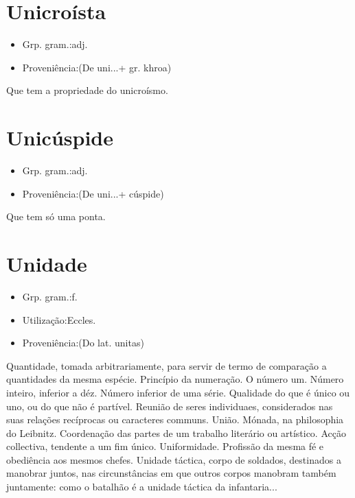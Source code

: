 \documentclass{article}
\begin{document}
\section{Unicroísta}
\begin{itemize}
\item {Grp. gram.:adj.}
\end{itemize}
\begin{itemize}
\item {Proveniência:(De \textunderscore uni...\textunderscore  + gr. \textunderscore khroa\textunderscore )}
\end{itemize}
Que tem a propriedade do unicroísmo.
\section{Unicúspide}
\begin{itemize}
\item {Grp. gram.:adj.}
\end{itemize}
\begin{itemize}
\item {Proveniência:(De \textunderscore uni...\textunderscore  + \textunderscore cúspide\textunderscore )}
\end{itemize}
Que tem só uma ponta.
\section{Unidade}
\begin{itemize}
\item {Grp. gram.:f.}
\end{itemize}
\begin{itemize}
\item {Utilização:Eccles.}
\end{itemize}
\begin{itemize}
\item {Proveniência:(Do lat. \textunderscore unitas\textunderscore )}
\end{itemize}
Quantidade, tomada arbitrariamente, para servir de termo de comparação a quantidades da mesma espécie.
Princípio da numeração.
O número um.
Número inteiro, inferior a déz.
Número inferior de uma série.
Qualidade do que é único ou uno, ou do que não é partível.
Reunião de seres individuaes, considerados nas suas relações recíprocas ou caracteres communs.
União.
Mónada, na philosophia do Leibnitz.
Coordenação das partes de um trabalho literário ou artístico.
Acção collectiva, tendente a um fim único.
Uniformidade.
Profissão da mesma fé e obediência aos mesmos chefes.
\textunderscore Unidade táctica\textunderscore , corpo de soldados, destinados a manobrar juntos, nas circunstâncias em que outros corpos manobram também juntamente: \textunderscore como o batalhão é a unidade táctica da infantaria...\textunderscore 
\end{document}
